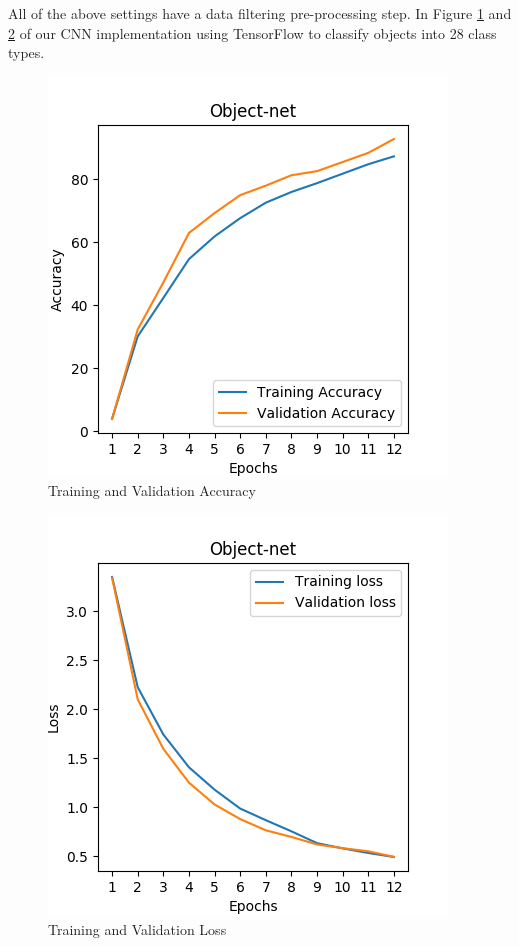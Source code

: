 All of the above settings have a data filtering pre-processing step. In Figure \ref{fig:accuracy} and \ref{fig:loss} of our CNN implementation using TensorFlow to classify objects into 28 class types.


\begin{figure}[htp]
\begin{center}
        \includegraphics[scale=0.5]{images/accuracy.png}
        \caption{Training and Validation Accuracy}
        \label{fig:accuracy}
\end{center}
\end{figure}



\begin{figure}[htp]
\begin{center}
        \includegraphics[scale=0.5]{images/loss.png}
        \caption{Training and Validation Loss}
        \label{fig:loss}
\end{center}
\end{figure}
